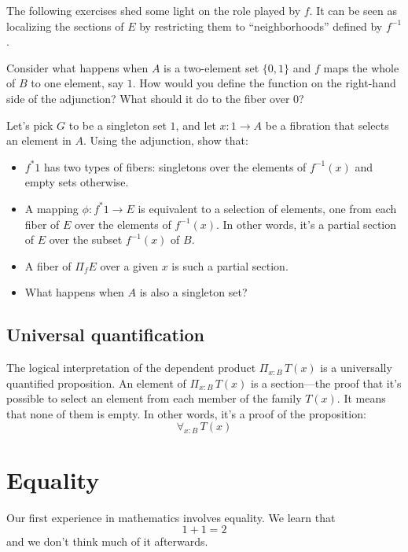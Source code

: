 \documentclass[DaoFP]{subfiles}
\begin{document}
The following exercises shed some light on the role played by $f$. It can be seen as localizing the sections of $E$ by restricting them to ``neighborhoods'' defined by $f^{-1}$.

\begin{exercise}
Consider what happens when $A$ is a two-element set $\{0, 1\}$ and $f$ maps the whole of $B$ to one element, say $1$. How would you define the function on the right-hand side of the adjunction? What should it do to the fiber over $0$?
\end{exercise}

\begin{exercise}
Let's pick $G$ to be a singleton set $1$, and let $x \colon 1 \to A$ be a fibration that selects an element in $A$. Using the adjunction, show that:
\begin{itemize}
\item $f^* 1$ has two types of fibers: singletons over the elements of $f^{-1} (x)$ and empty sets otherwise. 
\item A mapping $\phi \colon f^* 1 \to E$ is equivalent to a selection of elements, one from each fiber of $E$ over the elements of $f^{-1}(x)$. In other words, it's a partial section of $E$ over the subset $f^{-1}(x)$ of $B$.
\item A fiber of $\Pi_f E$ over a given $x$ is such a partial section. 
\item What happens when $A$ is also a singleton set?
\end{itemize}
\end{exercise}



\subsection{Universal quantification}

The logical interpretation of the dependent product $\Pi_{x : B} \, T(x)$ is a universally quantified proposition. An element of $\Pi_{x : B} \, T(x)$ is a section---the proof that it's possible to select an element from each member of the family $T(x)$. It means that none of them is empty. In other words, it's a proof of the proposition:
\[ \forall_{x : B}\, T(x) \]

\section{Equality}

Our first experience in mathematics involves equality. We learn that 
\[1+1=2\] 
and we don't think much of it afterwards. 
\end{document}
